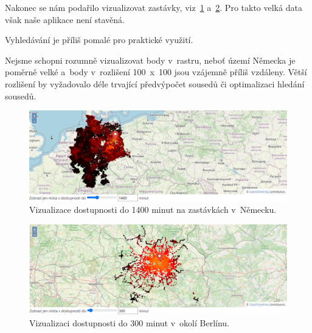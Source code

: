 Nakonec se nám podařilo vizualizovat zastávky, viz~\ref{fig:Nemecko-vse} a~\ref{fig:Nemecko-Berlin}. Pro takto velká data však naše aplikace není stavěná.

Vyhledávání je příliš pomalé pro praktické využití.

Nejsme schopni rozumně vizualizovat body v~rastru, neboť území Německa je poměrně velké a~body v~rozlišení 100~x~100 jsou vzájemně příliš vzdáleny. Větší rozlišení by vyžadovalo déle trvající předvýpočet sousedů či optimalizaci hledání sousedů.

\begin{figure}[ht]
    \centering
    \includegraphics[width=\textwidth]{../img/Nemecko-Vse.png}
    \caption{Vizualizace dostupnosti do 1400 minut na zastávkách v~Německu.}
    \label{fig:Nemecko-vse}
\end{figure}

\begin{figure}[ht]
    \centering
\includegraphics[width=\textwidth]{../img/Nemecko-Berlin.png}
    \caption{Vizualizaci dostupnosti do 300 minut v~okolí Berlínu.}
    \label{fig:Nemecko-Berlin}
\end{figure}